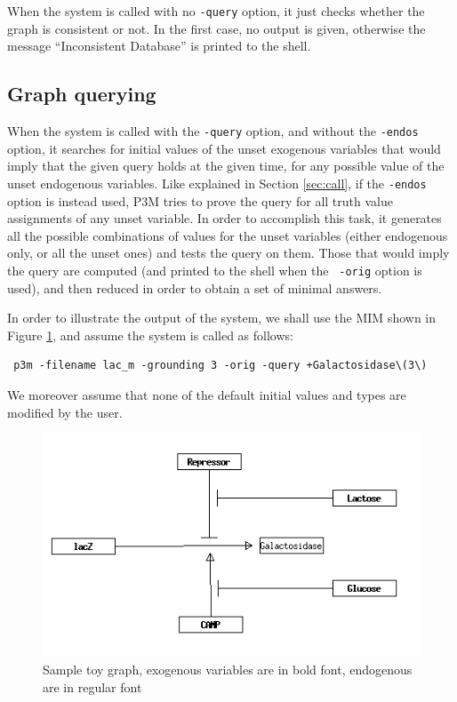 \documentclass[a4paper]{article}
\renewcommand{\red}[1]{#1}
\begin{document}
When the system is called with no {\tt -query} option, it just checks
whether the graph is consistent or not. In the first case, no output
is given, otherwise the message ``Inconsistent Database'' is printed
to the shell.

\subsection{Graph querying}

When the system is called with the {\tt -query} option, \red{and without
the {\tt -endos} option}, it searches
for initial values of the unset \red{exogenous} 
variables that would imply that the given query
holds at the given time, \red{for any possible value of the unset
  endogenous variables}. 
\red{Like explained in Section \ref{sec:call}, if the {\tt -endos} option
is instead used, P3M tries to prove the query for all truth value
assignments of any unset variable}.
In order to accomplish this task, it
generates all the possible combinations of values for the unset 
variables \red{(either endogenous only, or all the unset ones)} and tests
the query on them. Those that would imply the 
query are \red{computed (and printed to the shell when the {\tt
    -orig} option is used),} 
and then reduced in order to obtain a
set of minimal answers.

In order to illustrate the output of the system, we shall use the MIM
shown in Figure \ref{fig:lac3}, and assume the system is called as
follows:
\begin{verbatim}
 p3m -filename lac_m -grounding 3 -orig -query +Galactosidase\(3\)
\end{verbatim}
We moreover assume that 
none of the default
initial values and types are modified by the user.

\begin{figure}[htb]
\begin{center}
\includegraphics[scale=0.4]{lac_m0001.png}
\end{center}
\caption{Sample toy graph, exogenous variables are in bold font,
  endogenous are in regular font} 
\label{fig:lac3}
\end{figure}
\end{document}
